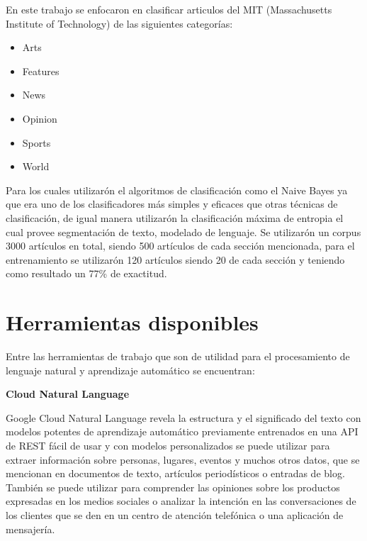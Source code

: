 En este trabajo se enfocaron en clasificar articulos del MIT (Massachusetts Institute of Technology) de las siguientes categorías:

	\begin{itemize}
		\item Arts
		\item Features
		\item News
		\item Opinion
		\item Sports
		\item World
	\end{itemize}
Para los cuales utilizarón el algoritmos de clasificación como el Naive Bayes ya que era uno de los clasificadores más simples y eficaces que otras técnicas de clasificación, de igual manera utilizarón la clasificación máxima de entropia el cual provee segmentación de texto, modelado de lenguaje.
Se utilizarón un corpus 3000 artículos en total, siendo 500 artículos de cada sección mencionada, para el entrenamiento se utilizarón 120 artículos siendo 20 de cada sección y teniendo como resultado un 77\% de exactitud\cite{siete}.


\section[Herramientas d.]{Herramientas disponibles}


Entre las herramientas de trabajo que son de utilidad para el procesamiento de lenguaje natural y aprendizaje automático se encuentran:\\

\begin{large}
	 \textbf{Cloud Natural Language}\\
\end{large}

Google Cloud Natural Language \cite{ocho} revela la estructura y el significado del texto con modelos potentes de aprendizaje automático previamente entrenados en una API de REST fácil de usar y con modelos personalizados se puede utilizar para extraer información sobre personas, lugares, eventos y muchos otros datos, que se mencionan en documentos de texto, artículos periodísticos o entradas de blog. También se puede utilizar para comprender las opiniones sobre los productos expresadas en los medios sociales o analizar la intención en las conversaciones de los clientes que se den en un centro de atención telefónica o una aplicación de mensajería.\\

